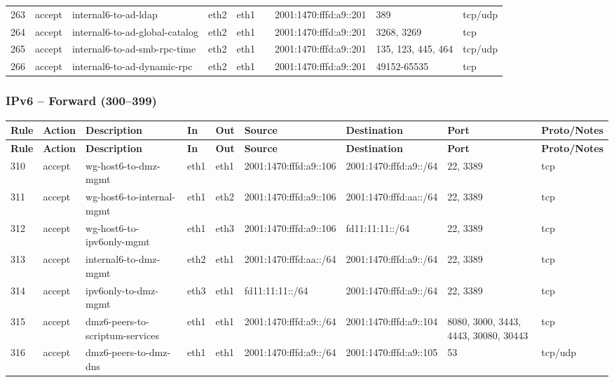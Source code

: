 \documentclass[a4paper,11pt]{article}
\begin{document}
\begin{landscape}
\begin{longtable}{|l|l|l|l|l|l|l|p{2.2cm}|l|}
263 & accept & internal6-to-ad-ldap & eth2 & eth1 & & 2001:1470:fffd:a9::201 & 389 & tcp/udp \\
264 & accept & internal6-to-ad-global-catalog & eth2 & eth1 & & 2001:1470:fffd:a9::201 & 3268, 3269 & tcp \\
265 & accept & internal6-to-ad-smb-rpc-time & eth2 & eth1 & & 2001:1470:fffd:a9::201 & 135, 123, 445, 464 & tcp/udp \\
266 & accept & internal6-to-ad-dynamic-rpc & eth2 & eth1 & & 2001:1470:fffd:a9::201 & 49152-65535 & tcp \\
\hline
\end{longtable}

\newpage

\subsubsection{IPv6 -- Forward (300--399)}
\begin{longtable}{|l|l|l|l|l|l|l|p{2.2cm}|l|}
\hline
\textbf{Rule} & \textbf{Action} & \textbf{Description} & \textbf{In} & \textbf{Out} & \textbf{Source} & \textbf{Destination} & \textbf{Port} & \textbf{Proto/Notes} \\
\hline
\endfirsthead
\hline
\textbf{Rule} & \textbf{Action} & \textbf{Description} & \textbf{In} & \textbf{Out} & \textbf{Source} & \textbf{Destination} & \textbf{Port} & \textbf{Proto/Notes} \\
\hline
\endhead
310 & accept & wg-host6-to-dmz-mgmt & eth1 & eth1 & 2001:1470:fffd:a9::106 & 2001:1470:fffd:a9::/64 & 22, 3389 & tcp \\
311 & accept & wg-host6-to-internal-mgmt & eth1 & eth2 & 2001:1470:fffd:a9::106 & 2001:1470:fffd:aa::/64 & 22, 3389 & tcp \\
312 & accept & wg-host6-to-ipv6only-mgmt & eth1 & eth3 & 2001:1470:fffd:a9::106 & fd11:11:11::/64 & 22, 3389 & tcp \\
313 & accept & internal6-to-dmz-mgmt & eth2 & eth1 & 2001:1470:fffd:aa::/64 & 2001:1470:fffd:a9::/64 & 22, 3389 & tcp \\
314 & accept & ipv6only-to-dmz-mgmt & eth3 & eth1 & fd11:11:11::/64 & 2001:1470:fffd:a9::/64 & 22, 3389 & tcp \\
315 & accept & dmz6-peers-to-scriptum-services & eth1 & eth1 & 2001:1470:fffd:a9::/64 & 2001:1470:fffd:a9::104 & 8080, 3000, 3443, 4443, 30080, 30443 & tcp \\
316 & accept & dmz6-peers-to-dmz-dns & eth1 & eth1 & 2001:1470:fffd:a9::/64 & 2001:1470:fffd:a9::105 & 53 & tcp/udp \\

\end{longtable}
\end{landscape}
\end{document}
